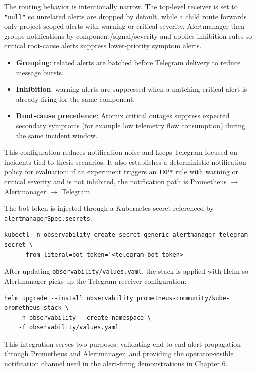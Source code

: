 The routing behavior is intentionally narrow. The top-level receiver is set to \texttt{"null"} so unrelated alerts are dropped by default, while a child route forwards only project-scoped alerts with warning or critical severity. Alertmanager then groups notifications by component/signal/severity and applies inhibition rules so critical root-cause alerts suppress lower-priority symptom alerts.

\begin{itemize}
    \item \textbf{Grouping}: related alerts are batched before Telegram delivery to reduce message bursts.
    \item \textbf{Inhibition}: warning alerts are suppressed when a matching critical alert is already firing for the same component.
    \item \textbf{Root-cause precedence}: Atomix critical outages suppress expected secondary symptoms (for example low telemetry flow consumption) during the same incident window.
\end{itemize}

This configuration reduces notification noise and keeps Telegram focused on incidents tied to thesis scenarios. It also establishes a deterministic notification policy for evaluation: if an experiment triggers an \texttt{IXP*} rule with warning or critical severity and is not inhibited, the notification path is Prometheus $\rightarrow$ Alertmanager $\rightarrow$ Telegram.

The bot token is injected through a Kubernetes secret referenced by \texttt{alertmanagerSpec.secrets}:

\begin{verbatim}
kubectl -n observability create secret generic alertmanager-telegram-secret \
    --from-literal=bot-token='<telegram-bot-token>'
\end{verbatim}

After updating \texttt{observability/values.yaml}, the stack is applied with Helm so Alertmanager picks up the Telegram receiver configuration:

\begin{verbatim}
helm upgrade --install observability prometheus-community/kube-prometheus-stack \
    -n observability --create-namespace \
    -f observability/values.yaml
\end{verbatim}

This integration serves two purposes: validating end-to-end alert propagation through Prometheus and Alertmanager, and providing the operator-visible notification channel used in the alert-firing demonstrations in Chapter 6.

